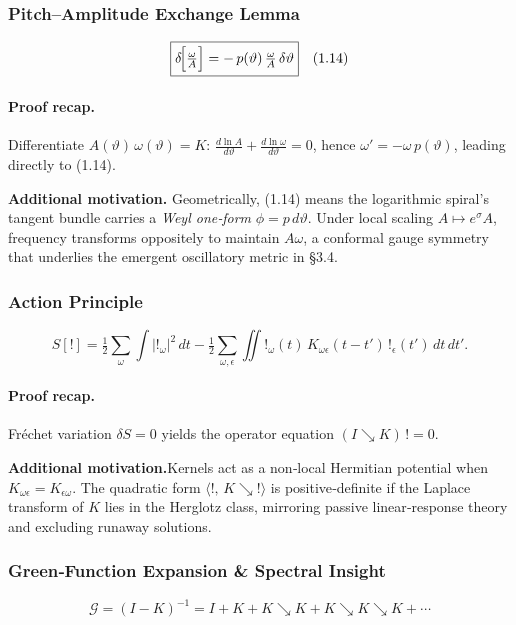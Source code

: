 \medskip
\subsubsection{Pitch–Amplitude Exchange Lemma}
\[
  \boxed{%
  \delta\!\Bigl[\tfrac{\omega}{A}\Bigr]
  = -\,p(\vartheta)\,\tfrac{\omega}{A}\,\delta\vartheta
  }\quad(1.14)
\]

\paragraph{Proof recap.}  
Differentiate \(A(\vartheta)\,\omega(\vartheta)=K\):  
\(\frac{d\ln A}{d\vartheta} + \frac{d\ln\omega}{d\vartheta}=0\), hence \(\omega'=-\omega\,p(\vartheta)\), leading directly to (1.14).

\begin{concept}
\textbf{Additional motivation.} Geometrically, (1.14) means the logarithmic spiral’s tangent bundle carries a \emph{Weyl one‐form} \(\phi = p\,d\vartheta\).  Under local scaling \(A\mapsto e^{\sigma}A\), frequency transforms oppositely to maintain \(A\omega\), a conformal gauge symmetry that underlies the emergent oscillatory metric in §3.4.
\end{concept}

\medskip
\subsubsection{Action Principle}
\[
  S[!]
  = \tfrac12\sum_{\omega}\int |!_{\omega}|^{2}\,dt
    - \tfrac12\sum_{\omega,\epsilon}
      \iint !_{\omega}(t)\,K_{\omega\epsilon}(t-t')\,!_{\epsilon}(t')\,dt\,dt'.
  \tag{1.15}
\]

\paragraph{Proof recap.}  
Fréchet variation \(\delta S = 0\) yields the operator equation \((I\searrow K)\,! = 0\).

\begin{concept}
\textbf{Additional motivation.}Kernels act as a non‐local Hermitian potential when \(K_{\omega\epsilon}=K_{\epsilon\omega}\).  The quadratic form \(\langle !,\,K\searrow!\rangle\) is positive‐definite if the Laplace transform of \(K\) lies in the Herglotz class, mirroring passive linear‐response theory and excluding runaway solutions.
\end{concept}

\medskip
\subsubsection{Green‐Function Expansion \& Spectral Insight}
\[
  \boxed{\;
  \mathcal{G}=(I-K)^{-1}
  = I + K + K\searrow K + K\searrow K\searrow K + \cdots
  \;}
\]

